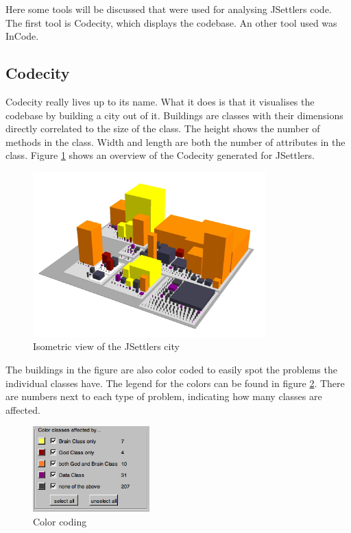 \documentclass[pdftex12pt, a4paper]{article}
\begin{document}
Here some tools will be discussed that were used for analysing JSettlers code. The first tool is Codecity, which displays the codebase. An other tool used was InCode.

\subsection{Codecity}

Codecity really lives up to its name. What it does is that it visualises the codebase by building a city out of it. Buildings are classes with their dimensions directly correlated to the size of the class. The height shows the number of methods in the class. Width and length are both the number of attributes in the class. Figure \ref{fig:codecityIso} shows an overview of the Codecity generated for JSettlers.

\begin{figure}
\begin{center}
\includegraphics[width=0.8\textwidth]{Image/Codecity/Codecity2.jpg}
\caption{Isometric view of the JSettlers city}
\label{fig:codecityIso}
\end{center}
\end{figure}

The buildings in the figure are also color coded to easily spot the problems the individual classes have. The legend for the colors can be found in figure \ref{fig:legendCodeCity}. There are numbers next to each type of problem, indicating how many classes are affected.

\begin{figure}
\begin{center}
\includegraphics[width=0.4\textwidth]{Image/Codecity/Codecity4.png}
\caption{Color coding}
\label{fig:legendCodeCity}
\end{center}
\end{figure}
\end{document}
